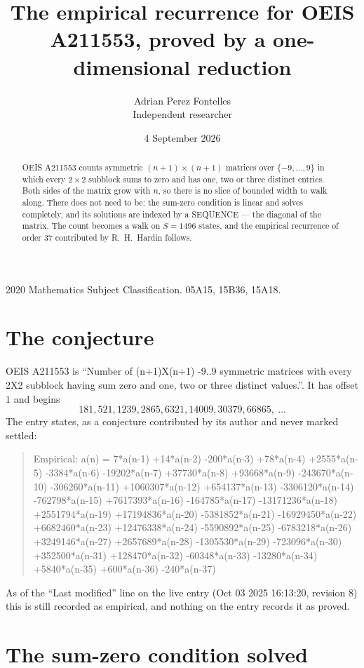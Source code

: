 \documentclass[11pt,a4paper]{article}
\title{The empirical recurrence for OEIS A211553, proved by a one-dimensional reduction}
\author{Adrian Perez Fontelles\\ \small Independent researcher}
\date{4 September 2026}
\theoremstyle{plain}
\theoremstyle{definition}
\begin{document}
\maketitle

\begin{abstract}
OEIS A211553 counts symmetric $(n+1)\times(n+1)$ matrices over
$\{-9,\dots,9\}$ in which every $2\times2$ subblock sums to zero and has one, two or three distinct
entries. Both sides of the matrix grow with $n$, so there is no slice of bounded width to walk
along. There does not need to be: the sum-zero condition is linear and solves completely, and
its solutions are indexed by a SEQUENCE --- the diagonal of the matrix. The count becomes a walk
on $S=1496$ states, and the empirical recurrence of order $37$ contributed by R.~H.~Hardin
follows.
\end{abstract}

\noindent\small 2020 Mathematics Subject Classification. 05A15, 15B36, 15A18.\normalsize

\section{The conjecture}

OEIS A211553 is ``Number of (n+1)X(n+1) -9..9 symmetric matrices with every 2X2 subblock having sum zero and one, two or three distinct values.''. It has offset $1$ and begins
\[
181, 521, 1239, 2865, 6321, 14009, 30379, 66865,\ \dots
\]
The entry states, as a conjecture contributed by its author and never marked settled:
\begin{quote}
Empirical: a(n) = 7*a(n-1) +14*a(n-2) -200*a(n-3) +78*a(n-4) +2555*a(n-5) -3384*a(n-6) -19202*a(n-7) +37730*a(n-8) +93668*a(n-9) -243670*a(n-10) -306260*a(n-11) +1060307*a(n-12) +654137*a(n-13) -3306120*a(n-14) -762798*a(n-15) +7617393*a(n-16) -164785*a(n-17) -13171236*a(n-18) +2551794*a(n-19) +17194836*a(n-20) -5381852*a(n-21) -16929450*a(n-22) +6682460*a(n-23) +12476338*a(n-24) -5590892*a(n-25) -6783218*a(n-26) +3249146*a(n-27) +2657689*a(n-28) -1305530*a(n-29) -723096*a(n-30) +352500*a(n-31) +128470*a(n-32) -60348*a(n-33) -13280*a(n-34) +5840*a(n-35) +600*a(n-36) -240*a(n-37)
\end{quote}
As of the ``Last modified'' line on the live entry (Oct 03 2025 16:13:20, revision 8) this is still
recorded as empirical, and nothing on the entry records it as proved.

\section{The sum-zero condition solved}
\end{document}
